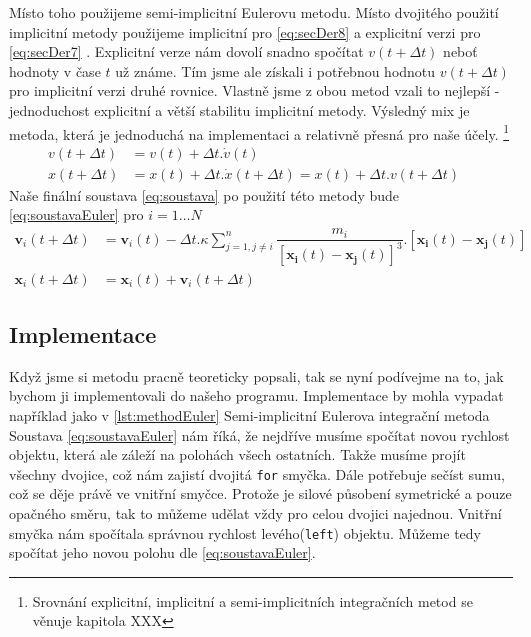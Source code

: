 Místo toho použijeme semi-implicitní Eulerovu metodu. Místo dvojitého použití implicitní metody použijeme implicitní pro \eqref{eq:secDer8} a explicitní verzi pro \eqref{eq:secDer7} . Explicitní verze nám dovolí snadno spočítat $ v(t + \Delta t) $ neboť hodnoty v čase $ t $ už známe. Tím jsme ale získali i potřebnou hodnotu $ v(t + \Delta t) $ pro implicitní verzi druhé rovnice. Vlastně jsme z obou metod vzali to nejlepší - jednoduchost explicitní a větší stabilitu implicitní metody. Výsledný mix je metoda, která je jednoduchá na implementaci a relativně přesná pro naše účely.
\footnote{Srovnání explicitní, implicitní a semi-implicitních integračních metod se věnuje kapitola XXX}
\begin{align}
\label{eq:secDer7}
v(t + \Delta t)&=v(t) + \Delta t . \dot{v}(t)\\
\label{eq:secDer8}
x(t+\Delta t) &= x(t) + \Delta t. \dot{x}(t + \Delta t) = x(t) + \Delta t.v(t + \Delta t)\quad
\end{align}
Naše finální soustava \eqref{eq:soustava} po použití této metody bude \eqref{eq:soustavaEuler} pro $ i=1 \dots N $
\begin{subequations}\label{eq:soustavaEuler}
\begin{align}
\boldsymbol {v}_i(t+\Delta t) &=\boldsymbol{{v}}_i(t)  - \Delta t . \kappa \sum_{j=1,j \neq i}^{n}\dfrac{m_i}
{\left[ \boldsymbol{x_i}(t) - \boldsymbol{x_j}(t)\right] ^3} . 
\left[ \boldsymbol{x_i}(t) - \boldsymbol{x_j}(t)\right] \\
\boldsymbol {x}_i(t+\Delta t)& =\boldsymbol{{x}}_i(t)  +\boldsymbol {v}_i(t+\Delta t)
\end{align}
\end{subequations}
\subsection{Implementace}
Když jsme si metodu pracně teoreticky popsali, tak se nyní podívejme na to, jak bychom ji implementovali do našeho programu. Implementace by mohla vypadat například jako v \ref{lst:methodEuler}
{Semi-implicitní Eulerova integrační metoda}
Soustava \eqref{eq:soustavaEuler} nám říká, že nejdříve musíme spočítat novou rychlost objektu, která ale záleží na polohách všech ostatních. Takže musíme projít všechny dvojice, což nám zajistí dvojitá \texttt{for} smyčka. Dále potřebuje sečíst sumu, což se děje právě ve vnitřní smyčce. Protože je silové působení symetrické a pouze opačného směru, tak to můžeme udělat vždy pro celou dvojici najednou.
Vnitřní smyčka nám spočítala správnou rychlost levého(\texttt{left}) objektu.
Můžeme tedy spočítat jeho novou polohu dle \eqref{eq:soustavaEuler}.

